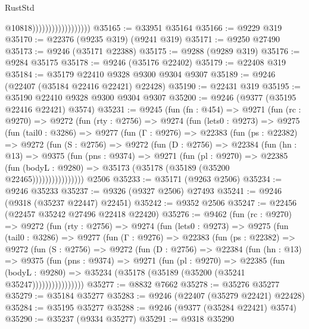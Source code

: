 \begin{lexlean}{RustStd}
\begin{coremodule}
                                        @10818))))))))))))))))))
@35165 := @33951 @35164
@35166 := @9229 @319
@35170 := @22376 (@9235 @319) (@9241 @319)
@35171 := @9250 @27490
@35173 := @9246 (@35171 @22388)
@35175 := @9288 (@9289 @319)
@35176 := @9284 @35175
@35178 := @9246 (@35176 @22402)
@35179 := @22408 @319
@35184 := @35179 @22410 @9328 @9300 @9304 @9307
@35189 := @9246 (@22407 (@35184 @22416 @22421) @22428)
@35190 := @22431 @319
@35195 := @35190 @22410 @9328 @9300 @9304 @9307
@35200 := @9246 (@9377 (@35195 @22416 @22421) @3574)
@35231 := @9245
    (fun (fn : @454) =>
    @9271
      (fun (rc : @9270) =>
      @9272
        (fun (rty : @2756) =>
        @9274
          (fun (lets0 : @9273) =>
          @9275
            (fun (tail0 : @3286) =>
            @9277
              (fun (Γ : @9276) =>
              @22383
                (fun (ps : @22382) =>
                @9272
                  (fun (S : @2756) =>
                  @9272
                    (fun (D : @2756) =>
                    @22384
                      (fun (hn : @13) =>
                      @9375
                        (fun (pns : @9374) =>
                        @9271
                          (fun (pl : @9270) =>
                          @22385
                            (fun (bodyL : @9280) =>
                            @35173 (@35178 (@35189 (@35200 @22465))))))))))))))))
    @2506
@35233 := @35171 (@9263 @2506)
@35234 := @9246 @35233
@35237 := @9326 (@9327 @2506) @27493
@35241 := @9246 (@9318 (@35237 @22447) @22451)
@35242 := @9352 @2506
@35247 := @22456 (@22457 @35242 @27496 @22418 @22420)
@35276 := @9462
    (fun (rc : @9270) =>
    @9272
      (fun (rty : @2756) =>
      @9274
        (fun (lets0 : @9273) =>
        @9275
          (fun (tail0 : @3286) =>
          @9277
            (fun (Γ : @9276) =>
            @22383
              (fun (ps : @22382) =>
              @9272
                (fun (S : @2756) =>
                @9272
                  (fun (D : @2756) =>
                  @22384
                    (fun (hn : @13) =>
                    @9375
                      (fun (pns : @9374) =>
                      @9271
                        (fun (pl : @9270) =>
                        @22385
                          (fun (bodyL : @9280) =>
                          @35234 (@35178 (@35189 (@35200 (@35241 @35247))))))))))))))))
@35277 := @8832 @7662
@35278 := @35276 @35277
@35279 := @35184 @35277
@35283 := @9246 (@22407 (@35279 @22421) @22428)
@35284 := @35195 @35277
@35288 := @9246 (@9377 (@35284 @22421) @3574)
@35290 := @35237 (@9334 @35277)
@35291 := @9318 @35290

\end{coremodule}
\end{lexlean}
